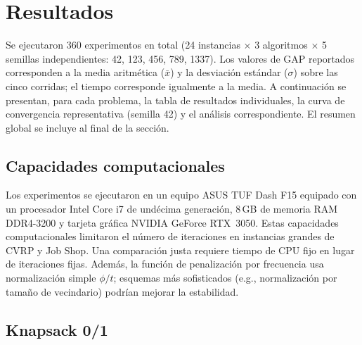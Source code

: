 \section{Resultados}
\label{sec:resultados}

Se ejecutaron 360 experimentos en total (24 instancias × 3 algoritmos
× 5 semillas independientes: 42, 123, 456, 789, 1337).
Los valores de GAP reportados corresponden a la media aritmética
($\bar{x}$) y la desviación estándar ($\sigma$) sobre las cinco
corridas; el tiempo corresponde igualmente a la media.
A continuación se presentan, para cada problema, la tabla de resultados
individuales, la curva de convergencia representativa (semilla 42) y el
análisis correspondiente. El resumen global se incluye al final de la sección.

\subsection{Capacidades computacionales}

Los experimentos se ejecutaron en un equipo ASUS TUF Dash F15 equipado con
un procesador Intel Core i7 de undécima generación, 8\,GB de memoria RAM
DDR4-3200 y tarjeta gráfica NVIDIA GeForce RTX~3050.
Estas capacidades computacionales limitaron el número de iteraciones
en instancias grandes de CVRP y Job Shop.
Una comparación justa requiere tiempo de CPU fijo en lugar de iteraciones
fijas.
Además, la función de penalización por frecuencia usa normalización simple
$\phi/t$; esquemas más sofisticados (e.g., normalización por tamaño de
vecindario) podrían mejorar la estabilidad.

\subsection{Knapsack 0/1}

